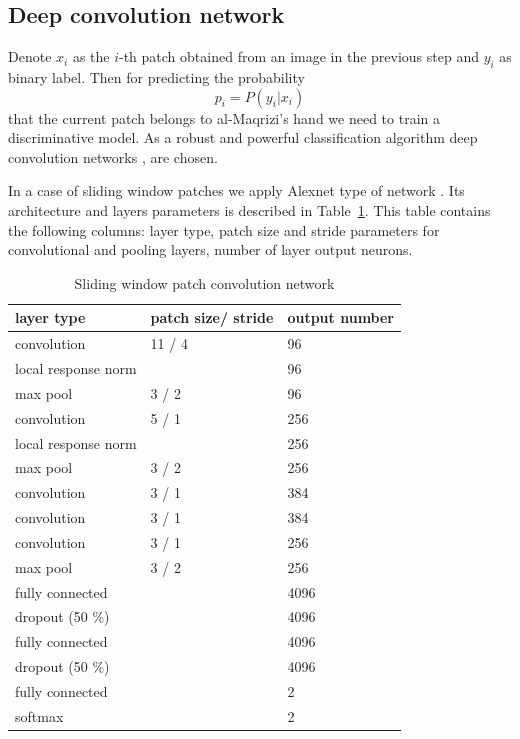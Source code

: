 \documentclass[conference,a4paper,twocolumn]{IEEEtran}
\begin{document}

\subsection{Deep convolution network}

Denote $x_i$ as the $i$-th patch obtained from an image in the previous step and $y_i$ as binary label. Then for predicting the probability
\begin{equation*}
	p_i = P(y_i | x_i)
\end{equation*}
that the current patch belongs to al-Maqrizi's hand we need to train a discriminative model. As a robust and powerful classification algorithm deep convolution networks \cite{DL}, \cite{CNN} are chosen. 

In a case of sliding window patches we apply Alexnet type of network \cite{Alexnet}. Its architecture and layers parameters is described in Table~\ref{alexnet_tab}. This table contains the following columns: layer type, patch size and stride parameters for convolutional and pooling layers, number of layer output neurons.  
\begin{table}[!b]
\centering
\caption{Sliding window patch convolution network}
\label{alexnet_tab}
\begin{tabular}{|l|p{1.3cm}|p{1.3cm}|}
\hline
\textbf{layer type} & \textbf{patch size/ stride} & \textbf{output number}  \\
\hline
convolution & 11 / 4 & 96 \\
\hline
local response norm & & 96 \\
\hline
max pool & 3 / 2 & 96 \\
\hline
convolution & 5 / 1 & 256 \\
\hline
local response norm & & 256 \\
\hline
max pool & 3 / 2 & 256 \\
\hline
convolution & 3 / 1 & 384 \\
\hline
convolution & 3 / 1 & 384 \\
\hline
convolution & 3 / 1 & 256 \\
\hline
max pool & 3 / 2 & 256 \\
\hline
fully connected & & 4096 \\
\hline
dropout (50 \%) & & 4096 \\
\hline
fully connected & & 4096 \\
\hline
dropout (50 \%) & & 4096 \\
\hline
fully connected & & 2 \\
\hline
softmax & & 2 \\
\hline
\end{tabular}
\end{table}
\end{document}
